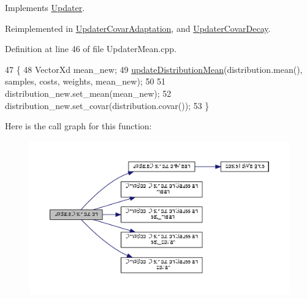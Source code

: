 Implements \hyperlink{classDmpBbo_1_1Updater_ac7a91b073fbe6e73a10c14fb73bd9689}{Updater}.



Reimplemented in \hyperlink{classDmpBbo_1_1UpdaterCovarAdaptation_aabb65aaf08049416ed18b294d5fca415}{Updater\+Covar\+Adaptation}, and \hyperlink{classDmpBbo_1_1UpdaterCovarDecay_aabb65aaf08049416ed18b294d5fca415}{Updater\+Covar\+Decay}.



Definition at line 46 of file Updater\+Mean.\+cpp.


\begin{DoxyCode}
47 \{
48   VectorXd mean\_new;
49   \hyperlink{classDmpBbo_1_1UpdaterMean_a97c2ddfabeee67dba0044f405f4ce8c0}{updateDistributionMean}(distribution.mean(), samples, costs, weights, mean\_new);
50 
51   distribution\_new.set\_mean(mean\_new);
52   distribution\_new.set\_covar(distribution.covar());
53 \}
\end{DoxyCode}


Here is the call graph for this function\+:
\nopagebreak
\begin{figure}[H]
\begin{center}
\leavevmode
\includegraphics[width=350pt]{classDmpBbo_1_1UpdaterMean_aabb65aaf08049416ed18b294d5fca415_cgraph}
\end{center}
\end{figure}



